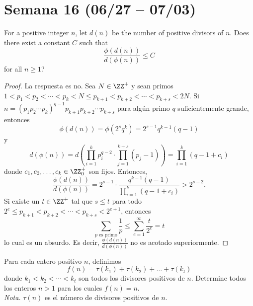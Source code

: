 \section{Semana 16 (06/27 -- 07/03)}


\begin{probHR}[ISL 2020/N6]
  For a positive integer $n$, let $d(n)$ be the number of positive divisors of
  $n$. Does there exist a constant $C$ such that
  \[\frac{\phi(d(n))}{d(\phi(n))}\le C\]
  for all $n\ge 1$?
\end{probHR}

\begin{proof}
  La respuesta es no. Sea $N\in\ZZ^+$ y sean primos
  $1<p_1<p_2<\cdots<p_k<N\le p_{k+1}<p_{k+2}<\cdots<p_{k+s}<2N$. Si
  $n=(p_1p_2\cdots p_k)^{q-1}p_{k+1}p_{k+2}\cdots p_{k+s}$ para algún primo $q$
  suficientemente grande, entonces
  \[\phi(d(n))=\phi(2^sq^k)=2^{s-1}q^{k-1}(q-1)\]
  y
  \[
    d(\phi(n))
    =d\left(\prod_{i=1}^kp_i^{q-2}\cdot\prod_{j=1}^{k+s}(p_j-1)\right)
    =\prod_{i=1}^k(q-1+c_i)
  \]
  donde $c_1,c_2,\dots,c_k\in\ZZ^+_0$ son fijos. Entonces,
  \[
    \frac{\phi(d(n))}{d(\phi(n))}
    =2^{s-1}\cdot\frac{q^{k-1}(q-1)}{\prod_{i=1}^k(q-1+c_i)}
    >2^{s-2}.
  \]
  Si existe un $t\in\ZZ^+$ tal que $s\le t$ para todo
  $2^e\le p_{k+1}<p_{k+2}<\cdots<p_{k+s}<2^{e+1}$, entonces
  \[\sum_{p\text{ es primo}}\frac1p\le\sum_{e=1}^\infty\frac{t}{2^e}=t\]
  lo cual es un absurdo. Es decir, $\frac{\phi(d(n))}{d(\phi(n))}$ no es acotado
  superiormente.
\end{proof}


\begin{probEG}
  Para cada entero positivo $n$, definimos
  \[f(n)=\tau(k_1)+\tau(k_2)+\dots+\tau(k_t)\]
  donde $k_1<k_2<\cdots<k_t$ son todos los divisores positivos de $n$. Determine
  todos los enteros $n>1$ para los cuales $f(n)=n$. \\[4pt]
  \emph{Nota.} $\tau(n)$ es el número de divisores positivos de $n$.
\end{probEG}

